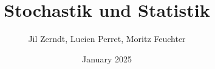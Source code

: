 \documentclass[a4paper, fontsize = 8pt, landscape]{scrartcl}
\title{Stochastik und Statistik}
\author{Jil Zerndt, Lucien Perret, Moritz Feuchter}
\date{January 2025}
\begin{document}
\begin{multicols}{3}
	\thispagestyle{TitlePageStyle}
	\maketitle
	\sffamily
	
	\raggedcolumns
    
    \raggedcolumns
	
	\raggedcolumns
	
	\raggedcolumns
	
	\raggedcolumns
	
	\raggedcolumns
	
	\raggedcolumns
	
	\raggedcolumns

%    
\end{multicols} 
\end{document}
